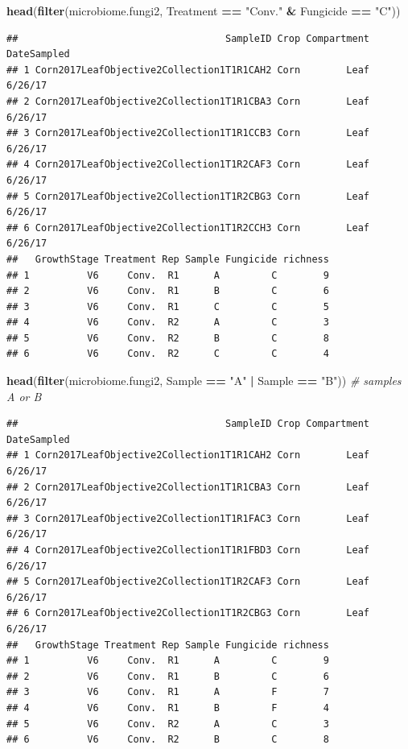 \documentclass[
]{article}
\newenvironment{Shaded}{\begin{snugshade}}{\end{snugshade}}
\newcommand{\CommentTok}[1]{\textcolor[rgb]{0.56,0.35,0.01}{\textit{#1}}}
\newcommand{\FunctionTok}[1]{\textcolor[rgb]{0.13,0.29,0.53}{\textbf{#1}}}
\newcommand{\NormalTok}[1]{#1}
\newcommand{\SpecialCharTok}[1]{\textcolor[rgb]{0.81,0.36,0.00}{\textbf{#1}}}
\newcommand{\StringTok}[1]{\textcolor[rgb]{0.31,0.60,0.02}{#1}}
\begin{document}
\begin{Shaded}
\begin{Highlighting}[]
\FunctionTok{head}\NormalTok{(}\FunctionTok{filter}\NormalTok{(microbiome.fungi2, Treatment }\SpecialCharTok{==} \StringTok{"Conv."} \SpecialCharTok{\&}\NormalTok{ Fungicide }\SpecialCharTok{==} \StringTok{"C"}\NormalTok{))}
\end{Highlighting}
\end{Shaded}

\begin{verbatim}
##                                    SampleID Crop Compartment DateSampled
## 1 Corn2017LeafObjective2Collection1T1R1CAH2 Corn        Leaf     6/26/17
## 2 Corn2017LeafObjective2Collection1T1R1CBA3 Corn        Leaf     6/26/17
## 3 Corn2017LeafObjective2Collection1T1R1CCB3 Corn        Leaf     6/26/17
## 4 Corn2017LeafObjective2Collection1T1R2CAF3 Corn        Leaf     6/26/17
## 5 Corn2017LeafObjective2Collection1T1R2CBG3 Corn        Leaf     6/26/17
## 6 Corn2017LeafObjective2Collection1T1R2CCH3 Corn        Leaf     6/26/17
##   GrowthStage Treatment Rep Sample Fungicide richness
## 1          V6     Conv.  R1      A         C        9
## 2          V6     Conv.  R1      B         C        6
## 3          V6     Conv.  R1      C         C        5
## 4          V6     Conv.  R2      A         C        3
## 5          V6     Conv.  R2      B         C        8
## 6          V6     Conv.  R2      C         C        4
\end{verbatim}

\begin{Shaded}
\begin{Highlighting}[]
\FunctionTok{head}\NormalTok{(}\FunctionTok{filter}\NormalTok{(microbiome.fungi2, Sample }\SpecialCharTok{==} \StringTok{"A"} \SpecialCharTok{|}\NormalTok{ Sample }\SpecialCharTok{==} \StringTok{"B"}\NormalTok{)) }\CommentTok{\# samples A or B}
\end{Highlighting}
\end{Shaded}

\begin{verbatim}
##                                    SampleID Crop Compartment DateSampled
## 1 Corn2017LeafObjective2Collection1T1R1CAH2 Corn        Leaf     6/26/17
## 2 Corn2017LeafObjective2Collection1T1R1CBA3 Corn        Leaf     6/26/17
## 3 Corn2017LeafObjective2Collection1T1R1FAC3 Corn        Leaf     6/26/17
## 4 Corn2017LeafObjective2Collection1T1R1FBD3 Corn        Leaf     6/26/17
## 5 Corn2017LeafObjective2Collection1T1R2CAF3 Corn        Leaf     6/26/17
## 6 Corn2017LeafObjective2Collection1T1R2CBG3 Corn        Leaf     6/26/17
##   GrowthStage Treatment Rep Sample Fungicide richness
## 1          V6     Conv.  R1      A         C        9
## 2          V6     Conv.  R1      B         C        6
## 3          V6     Conv.  R1      A         F        7
## 4          V6     Conv.  R1      B         F        4
## 5          V6     Conv.  R2      A         C        3
## 6          V6     Conv.  R2      B         C        8
\end{verbatim}
\end{document}
